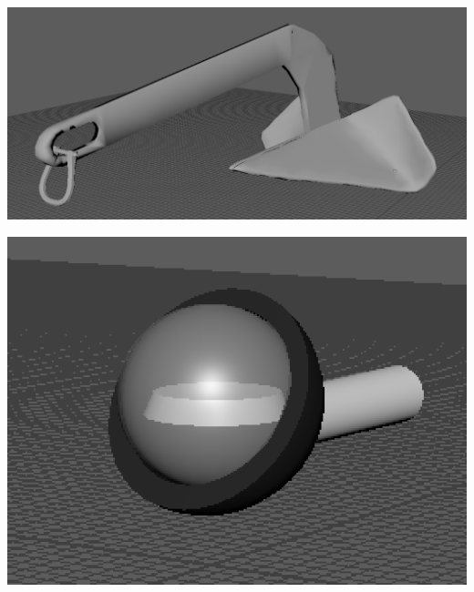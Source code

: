 \documentclass[a4paper, openright, twoside]{book}
\begin{document}
\begin{minipage}{\textwidth}
\begin{center}
    \centering
    \begin{minipage}{0.25\textwidth}
        \centering
        \includegraphics[width=1\textwidth]{images/anchor.png}
    \end{minipage}\hfill
    \begin{minipage}{0.25\textwidth}
        \centering
        \includegraphics[width=1\textwidth]{images/compass.png}
    \end{minipage}\hfill
    \begin{minipage}{0.25\textwidth}
        \centering

\end{minipage}
\end{center}
\end{minipage}
\end{document}
